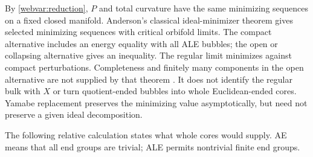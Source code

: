 By \eqref{webvar:reduction}, $P$ and total curvature have the same
minimizing sequences on a fixed closed manifold.  Anderson's classical
ideal-minimizer theorem \cite[Theorem~4.10]{Anderson2005} gives selected
minimizing sequences with critical orbifold limits.  The compact
alternative includes an energy equality with all ALE bubbles; the
open or collapsing alternative gives an inequality.  The regular
limit minimizes against compact perturbations.  Completeness and
finitely many components in the open alternative are not supplied
by that theorem \cite[Remark~4.12]{Anderson2005}.  It does not identify
the regular bulk with $X$ or turn quotient-ended bubbles into whole
Euclidean-ended cores.  Yamabe replacement preserves the minimizing
value asymptotically, but need not preserve a given ideal decomposition.

The following relative calculation states what whole cores would
supply.  AE means that all end groups are trivial; ALE permits
nontrivial finite end groups.

